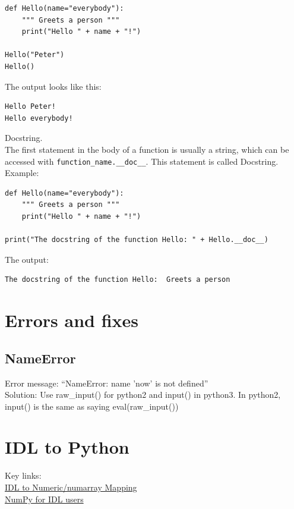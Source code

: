 \documentclass[11pt,a4paper]{article}
\begin{document}
\begin{lstlisting}
def Hello(name="everybody"):
    """ Greets a person """
    print("Hello " + name + "!")

Hello("Peter")
Hello()
\end{lstlisting}

\noindent
The output looks like this:

\begin{lstlisting}
Hello Peter!
Hello everybody!
\end{lstlisting}

\noindent
Docstring.\\
The first statement in the body of a function is usually a string, which can be accessed with {\tt function\_name.\_\_doc\_\_}. This statement is called Docstring. Example:

\begin{lstlisting}
def Hello(name="everybody"):
    """ Greets a person """
    print("Hello " + name + "!")

print("The docstring of the function Hello: " + Hello.__doc__)
\end{lstlisting}

\noindent 
The output:
\begin{lstlisting}
The docstring of the function Hello:  Greets a person 
\end{lstlisting}






\newpage
\section{Errors and fixes}
    \subsection{NameError}
    Error message: ``NameError: name 'now' is not defined''\\
    Solution: Use raw\_input() for python2 and input() in python3. In python2, input() is the same as saying eval(raw\_input()) \\ 







\newpage
\section{IDL to Python}
Key links:\\
\href{http://www.johnny-lin.com/cdat_tips/tips_array/idl2num.html}{IDL to Numeric/numarray Mapping}\\
\href{http://www.astro.umd.edu/~mbk/idl-numpy.html}{NumPy for IDL users}\\
\end{document}
